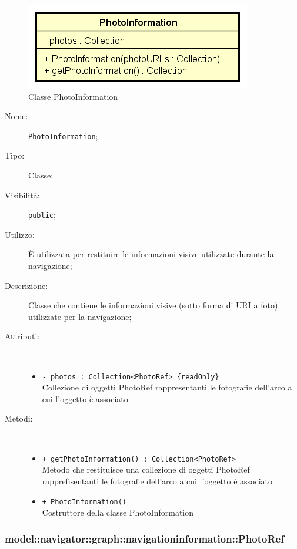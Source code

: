 \documentclass[../DefinizioneDiProdotto.tex]{subfiles}
\begin{document}
    \begin{figure}[H]
        \centering
        \includegraphics{img/PhotoInformation.png}
        \caption{Classe PhotoInformation}\label{fig:model::navigator::graph::navigationinformation::PhotoInformation} 
    \end{figure}
    \begin{description}
\item[Nome:] \texttt{PhotoInformation};
\item[Tipo:] Classe;
\item[Visibilità:] \texttt{public};
\item[Utilizzo:] È utilizzata per restituire le informazioni visive utilizzate durante la navigazione;
\item[Descrizione:] Classe che contiene le informazioni visive (sotto forma di URI a foto) utilizzate per la navigazione;
\item[Attributi:] \
\begin{itemize}
\item \texttt{- photos : Collection<PhotoRef> \{readOnly\}}\\
Collezione di oggetti PhotoRef rappresentanti le fotografie dell'arco a cui l'oggetto è associato

\end{itemize}
\item[Metodi:] \
\begin{itemize}
\item \texttt{+ getPhotoInformation() : Collection<PhotoRef>}\\
Metodo che restituisce una collezione di oggetti PhotoRef rapprefìsentanti le fotografie dell'arco a cui l'oggetto è associato
 \item \texttt{+ PhotoInformation()}\\
Costruttore della classe PhotoInformation
 \end{itemize}
\end{description}

\subsubsection{model::navigator::graph::navigationinformation::PhotoRef}
\end{document}
